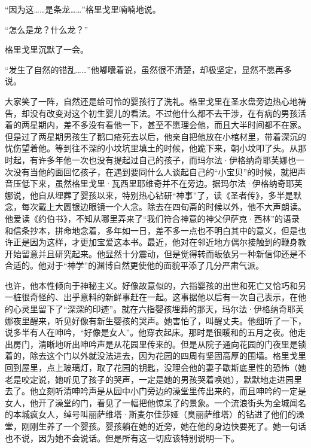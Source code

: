 \par “因为这……是条龙……”格里戈里喃喃地说。
\par “怎么是龙？什么龙？”
\par 格里戈里沉默了一会。
\par “发生了自然的错乱……”他嘟囔着说，虽然很不清楚，却极坚定，显然不愿再多说。
\par 大家笑了一阵，自然还是给可怜的婴孩行了洗礼。格里戈里在圣水盘旁边热心地祷告，却没有改变对这个初生婴儿的看法。不过他什么都不去干涉，在有病的男孩活着的两星期内，差不多没有看他一下，甚至不愿理会他，而且大半时间都不在家。但是过了两星期男孩生了鹅口疮死去以后，他亲自把他放在小棺材里，带着深沉的忧伤望着他。等到往不深的小坟坑里填土的时候，他跪下来，朝小坟叩了头。从那时起，有许多年他一次也没有提起过自己的孩子，而玛尔法·伊格纳奇耶芙娜也一次没有当他的面回忆孩子，在遇到要同什么人谈起自己的“小宝贝”的时候，就把声音压低下来，虽然格里戈里·瓦西里耶维奇并不在旁边。据玛尔法·伊格纳奇耶芙娜说，他自从埋葬了婴孩以来，特别热心钻研“神事”了，读《圣者传》，多半是默念，每次戴上大圆银边眼镜一个人念。除去在四旬斋的时候以外，他不大声朗读。他爱读《约伯书》，不知从哪里弄来了“我们符合神意的神父伊萨克·西林”的语录和信条抄本，拼命地念着，多年如一日，差不多一点也不明白其中的意义，但是也许正是因为这样，才更加宝爱这本书。最近，他对在邻近地方偶尔接触到的鞭身教开始留意并且研究起来。他显然十分震动，但是觉得转而皈依另一种新信仰还是不合适的。他对于“神学”的渊博自然更使他的面貌平添了几分严肃气派。
\par 也许，他本性倾向于神秘主义。好像故意似的，六指婴孩的出世和死亡又恰巧和另一桩很奇怪的、出乎意料的新鲜事赶在一起。这事据他以后有一次自己表示，在他的心灵里留下了“深深的印迹”。就在六指婴孩埋葬的那天，玛尔法·伊格纳奇耶芙娜夜里醒来，听见好像有新生婴孩的哭声。她害怕了，叫醒丈夫。他细听了一下，说多半有人在呻吟，“好像是女人”。他穿衣起床。那时是很暖和的五月之夜。他走出房门，清晰地听出呻吟声是从花园里传来的。但是从院子通向花园的门夜里是锁着的，除去这个门以外就没法进去，因为花园的四周有坚固高厚的围墙。格里戈里回到屋里，点上玻璃灯，取了花园的钥匙，没理会他的妻子歇斯底里性的恐怖（她老是咬定说，她听见了孩子的哭声，一定是她的男孩哭着唤她），默默地走进园里去了。他立刻听清呻吟声是从园中小门旁边的澡堂里传出来的，而且呻吟的一定是女人，他开了澡堂的门，看见了一幅把他惊呆了的景象。一个流浪街头为全城闻名的本城疯女人，绰号叫丽萨维塔·斯麦尔佳莎娅（臭丽萨维塔）的钻进了他们的澡堂，刚刚生养了一个婴孩。婴孩躺在她的近旁，她在他的身边快要死了。她一句话也不说，因为她不会说话。但是所有这一切应该特别说明一下。
